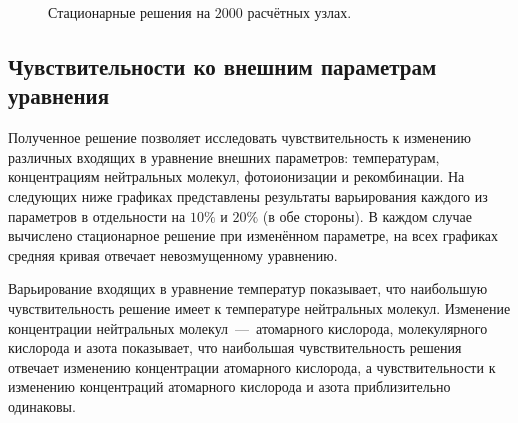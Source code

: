 \documentclass[14pt, a4paper, fleqn]{extarticle}
\begin{document}
\begin{figure}[H]
\caption{Стационарные решения на $2000$ расчётных узлах.}
\end{figure}

\subsection{Чувствительности ко внешним параметрам уравнения}



Полученное решение позволяет исследовать чувствительность к изменению различных входящих в уравнение внешних параметров: температурам, концентрациям нейтральных молекул, фотоионизации и рекомбинации. На следующих ниже графиках представлены результаты варьирования каждого из параметров в отдельности на $10\%$ и $20\%$ (в обе стороны). В каждом случае вычислено стационарное решение при изменённом параметре, на всех графиках средняя кривая отвечает невозмущенному уравнению.

\medskip

Варьирование входящих в уравнение температур показывает, что наибольшую чувствительность решение имеет к температуре нейтральных молекул. Изменение концентрации нейтральных молекул~---~атомарного кислорода, молекулярного кислорода и азота показывает, что наибольшая чувствительность решения отвечает изменению концентрации атомарного кислорода, а чувствительности к изменению концентраций атомарного кислорода и азота приблизительно одинаковы.

\medskip
\end{document}

